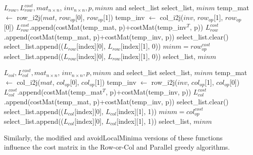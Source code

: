 \begin{algorithm}
\caption{availableRowOperatorSelection}
\begin{algorithmic}[1]
\Require $L_{row}, L_{row}^{cost}, mat_{n \times n}$, $inv_{n \times n}, p, minm$ and select\_list
\Ensure select\_list, $minm$
	\State temp\_mat $\leftarrow$ row\_i2j($mat$, $row_{op}$[0], $row_{op}$[1])
	\State temp\_inv $\leftarrow$ col\_i2j($inv$, $row_{op}$[1], $row_{op}$[0])
		\State $L_{row}^{cost}$.append(costMat(temp\_mat, p)+costMat(temp\_inv$^{T}$, p))
	\Else
		\State $L_{row}^{cost}$.append(costMat(temp\_mat, p)+costMat(temp\_inv, p))
	\EndIf
\EndFor
{}
		\State select\_list.clear()
		\State select\_list.append(($L_{row}$[index][0], $L_{row}$[index][1], 0))
		\State $minm = row_{op}^{cost}$
		\State select\_list.append(($L_{row}$[index][0], $L_{row}$[index][1], 0))
    \EndIf
\EndFor
\State \Return select\_list, $minm$
\end{algorithmic}
\end{algorithm}

\begin{algorithm}
\caption{availableColOperatorSelection}
\begin{algorithmic}[1]
\Require $L_{col}, L_{col}^{cost}, mat_{n \times n}$, $inv_{n \times n}, p, minm$ and select\_list
\Ensure select\_list, $minm$
	\State temp\_mat $\leftarrow$ col\_i2j($mat$, $col_{op}$[0], $col_{op}$[1])
	\State temp\_inv $\leftarrow$ row\_i2j($inv$, $col_{op}$[1], $col_{op}$[0])
		\State $L_{col}^{cost}$.append(costMat(temp\_mat$^{T}$, p)+costMat(temp\_inv, p))
	\Else
		\State $L_{col}^{cost}$.append(costMat(temp\_mat, p)+costMat(temp\_inv, p))
	\EndIf
\EndFor
{}
		\State select\_list.clear()
		\State select\_list.append(($L_{col}$[index][0], $L_{col}$[index][1], 1))
		\State $minm = col_{op}^{cost}$
		\State select\_list.append(($L_{col}$[index][0], $L_{col}$[index][1], 1))
    \EndIf
\EndFor
\State \Return select\_list, $minm$
\end{algorithmic}
\end{algorithm}

Similarly, the modified and avoidLocalMinima versions of these functions influence the cost matrix in the Row-or-Col and Parallel greedy algorithms.

